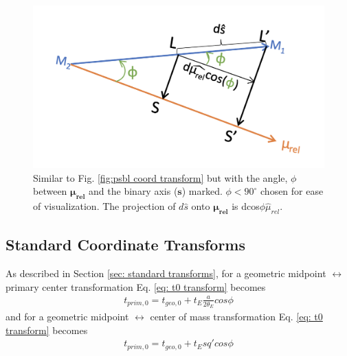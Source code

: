 \documentclass[twocolumn]{aastex701}
\newcommand{\vect}[1]{\boldsymbol{#1}}
\begin{document}
\begin{figure}
    \centering
    \includegraphics[scale=0.6]{figures/psbl_geometry_projection.png}
    \caption{Similar to Fig. \ref{fig:psbl coord transform} but with the angle, $\phi$ between $\vect{\mu_{rel}}$ and the binary axis ($\vect{s}$) marked. $\phi < 90^{\circ}$ chosen for ease of visualization. The projection of $d\hat{s}$ onto $\vect{\mu_{rel}}$ is dcos$\phi\hat{\mu}_{rel}$.}
    \label{fig:psbl geometry projection}
\end{figure}

\subsection{Standard Coordinate Transforms}
As described in Section \ref{sec: standard transforms}, for a geometric midpoint $\leftrightarrow$ primary center transformation Eq. \ref{eq: t0 transform} becomes
\begin{eqnarray}
    t_{prim, 0} = t_{geo, 0} + t_E\frac{a}{2\theta_E}cos\phi
\end{eqnarray}
and for a geometric midpoint $\leftrightarrow$ center of mass transformation Eq. \ref{eq: t0 transform} becomes
\begin{eqnarray}
    t_{prim, 0}  = t_{geo, 0} + t_Esq'cos\phi
\end{eqnarray}




\end{document}
